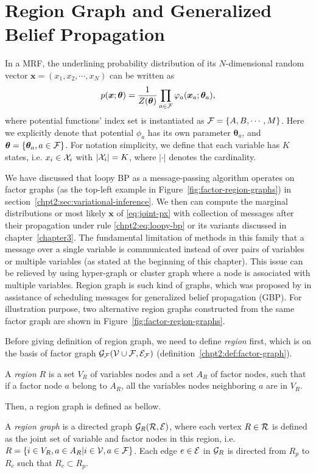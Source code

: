 \section{Region Graph and Generalized Belief Propagation}

In a MRF, the underlining probability distribution of its $N$-dimensional random vector $\bm{x}=(x_1, x_2, \cdots, x_N)$ can be written as
\begin{equation}\label{eq:joint-px}
  p(\bm{x}; \bm{\theta}) = \frac{1}{Z(\bm{\theta})} \prod_{a \in \mathcal{F}} \varphi_{a}(\bm{x}_{a}; \bm{\theta}_a),
\end{equation}
where potential functions' index set is instantiated as $\mathcal{F} = \left\{ A, B, \cdots, M \right\}$. Here we explicitly denote that potential $\phi_a$ has its own parameter $\bm{\theta}_a$, and $\bm{\theta} = \{\bm{\theta}_a, a\in \mathcal{F}\}$. For notation simplicity, we define that each variable has $K$ states, i.e. $x_i \in \mathcal{X}_i$ with $|\mathcal{X}_i|=K$, where $|\cdot|$ denotes the cardinality.

We have discussed that loopy BP as a message-passing algorithm operates on factor graphs (as the top-left example in Figure~\ref{fig:factor-region-graphs}) in section~\ref{chpt2:sec:variational-inference}. We then can compute the marginal distributions or most likely $\bm{x}$ of \eqref{eq:joint-px} with collection of messages after their propagation under rule \eqref{chpt2:eq:loopy-bp} or its variants discussed in chapter~\ref{chapter3}. The fundamental limitation of methods in this family that a message over a single variable is communicated instead of over pairs of variables or multiple variables (as stated at the beginning of this chapter). This issue can be relieved by using hyper-graph or cluster graph where a node is associated with multiple variables. Region graph is such kind of graphs, which was proposed by \cite{yedida2005constucting, DBLP:journals/corr/abs-1207-4158} in assistance of scheduling messages for generalized belief propagation (GBP). For illustration purpose, two alternative region graphs constructed from the same factor graph are shown in Figure~\ref{fig:factor-region-graphs}.

Before giving definition of region graph, we need to define \textit{region} first, which is on the basis of factor graph $\mathcal{G}_{\mathcal{F}}(\mathcal{V} \cup \mathcal{F}, \mathcal{E}_{\mathcal{F}})$ (definition~\ref{chpt2:def:factor-graph}).
\begin{definition}
  A \textit{region} $R$ is a set $V_R$ of variables nodes and a set $A_R$ of factor nodes, such that if a factor node $a$ belong to $A_R$, all the variables nodes neighboring $a$ are in $V_R$.
\end{definition}
Then, a region graph is defined as bellow.
\begin{definition}\label{def:region-graph}
  A \textit{region graph} is  a directed graph $\mathcal{G}_R(\mathcal{R}, \mathcal{E})$, where each vertex $R \in \mathcal{R}$ is defined as the joint set of variable and factor nodes in this region, i.e. $R = \left\{ i \in V_R, a \in A_R | i \in \mathcal{V}, a \in \mathcal{F} \right\}$. Each edge $e \in \mathcal{E}$ in $\mathcal{G}_R$ is directed from $R_p$ to $R_c$ such that $R_c \subset R_p$. 
\end{definition}


